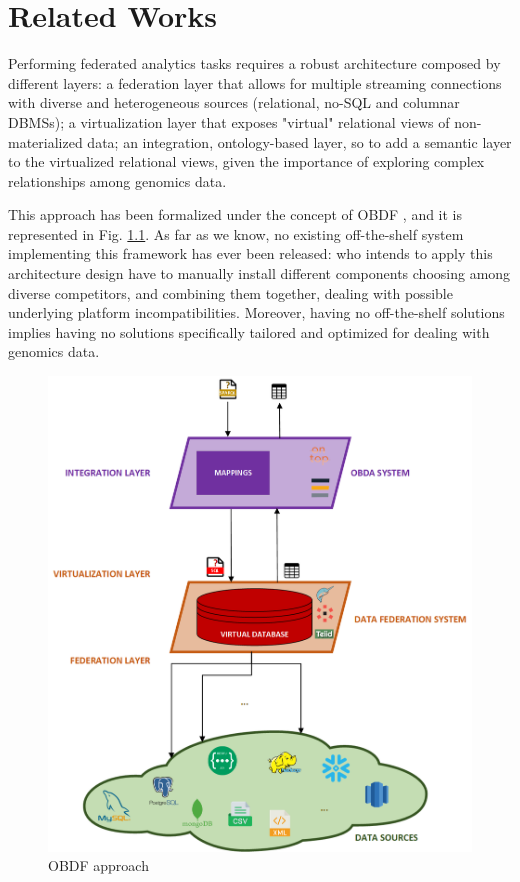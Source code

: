 
\chapter{Related Works}
\label{chp:related}

Performing federated analytics tasks requires a robust architecture composed by different layers: a federation layer that allows for multiple streaming connections with diverse and heterogeneous sources (relational, no-SQL and columnar \ac{DBMS}s); a virtualization layer that exposes "virtual" relational views of non-materialized data; an integration, ontology-based layer, so to add a semantic layer to the virtualized relational views, given the importance of exploring complex relationships among genomics data.

This approach has been formalized under the concept of \ac{OBDF} \cite{DBLP:conf/icde/GuCPLMX24}, and it is represented in Fig. \ref{fig:obdf}. As far as we know, no existing off-the-shelf system implementing this framework has ever been released: who intends to apply this architecture design have to manually install different components choosing among diverse competitors, and combining them together, dealing with possible underlying platform incompatibilities. Moreover, having no off-the-shelf solutions implies having no solutions specifically tailored and optimized for dealing with genomics data.

\begin{figure}[ht]
    \centering
    \includegraphics[width=11.5cm]{res/Drawing4.png}
    \caption{OBDF approach}
    \label{fig:obdf}
\end{figure}

